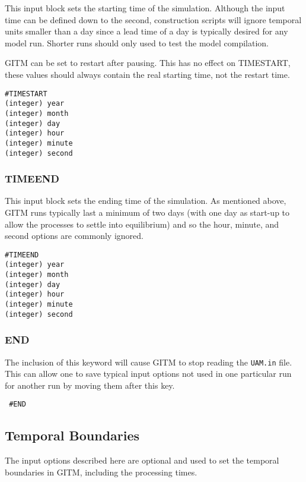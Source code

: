 This input block sets the starting time of the simulation.  Although the input time can be defined down to the second, construction scripts will ignore temporal units smaller than a day since a lead time of a day is typically desired for any model run.  Shorter runs should only used to test the model compilation.

GITM can be set to restart after pausing.  This has no effect on TIMESTART, these values should always contain the real starting time, not the restart time.

\begin{verbatim}
#TIMESTART
(integer) year   
(integer) month 
(integer) day    
(integer) hour    
(integer) minute 
(integer) second
\end{verbatim}

\subsubsection{TIMEEND}
\label{endtime.sec}

This input block sets the ending time of the simulation.  As mentioned above, GITM runs typically last a minimum of two days (with one day as start-up to allow the processes to settle into equilibrium) and so the hour, minute, and second options are commonly ignored.

\begin{verbatim}
#TIMEEND
(integer) year    
(integer) month
(integer) day     
(integer) hour    
(integer) minute  
(integer) second  
\end{verbatim}

\subsubsection{END}
\label{end.sec}
 The inclusion of this keyword will cause GITM to stop reading the {\tt UAM.in} file.  This can allow one to save typical input options not used in one particular run for another run by moving them after this key.
 
 \begin{verbatim}
 #END
 \end{verbatim}


\subsection{Temporal Boundaries}
\label{time.sec}

The input options described here are optional and used to set the temporal boundaries in GITM, including the processing times.

